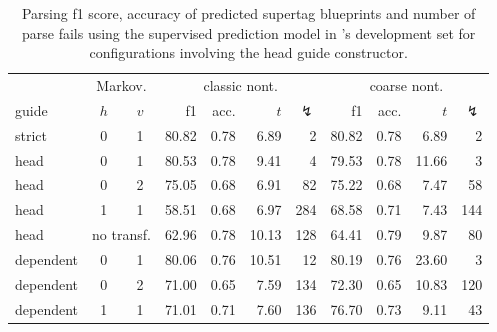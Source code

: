 \documentclass[../../document.tex]{subfiles}
\begin{document}
    
    \begin{table}
        \caption{\label{tbl:gridsearch:head:2}
        Parsing f1 score, accuracy of predicted supertag blueprints and number of parse fails using the supervised prediction model in \negra{}'s development set for configurations involving the head guide constructor.
        }
        \centering
        \vspace{.2cm}
        \begin{tabular}{lcc|rrrr|rrrr}
            \toprule
            & \multicolumn{2}{c|}{Markov.} & \multicolumn{4}{c|}{classic nont.} &  \multicolumn{4}{c}{coarse nont.} \\
guide           & \(h\) & \(v\) & f1 & acc. & $t$ & $\lightning$ & f1 & acc. & $t$ & $\lightning$  \\ \hline \rowcolor{black!10}
strict & 0 & 1                         & 80.82 & 0.78 &  6.89 &   2 & 80.82 & 0.78 &  6.89 &   2 \\  \hline
head & 0 & 1                           & 80.53 & 0.78 &  9.41 &   4 & 79.53 & 0.78 & 11.66 &   3 \\
head & 0 & 2                           & 75.05 & 0.68 &  6.91 &  82 & 75.22 & 0.68 &  7.47 &  58 \\
head & 1 & 1                           & 58.51 & 0.68 &  6.97 & 284 & 68.58 & 0.71 &  7.43 & 144 \\
head & \multicolumn{2}{c|}{no transf.} & 62.96 & 0.78 & 10.13 & 128 & 64.41 & 0.79 &  9.87 &  80 \\\hline
dependent & 0 & 1                      & 80.06 & 0.76 & 10.51 &  12 & 80.19 & 0.76 & 23.60 &   3 \\
dependent & 0 & 2                      & 71.00 & 0.65 &  7.59 & 134 & 72.30 & 0.65 & 10.83 & 120 \\
dependent & 1 & 1                      & 71.01 & 0.71 &  7.60 & 136 & 76.70 & 0.73 &  9.11 &  43 \\
\bottomrule
        \end{tabular}
    \end{table}
\end{document}
